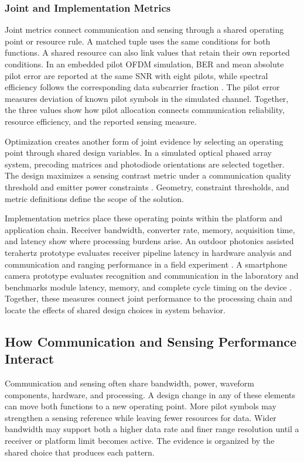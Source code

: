 \subsubsection{Joint and Implementation Metrics}

Joint metrics connect communication and sensing through a shared operating
point or resource rule. A matched tuple uses the same conditions for both
functions. A shared resource can also link values that retain their own
reported conditions. In an embedded pilot OFDM simulation, BER and mean
absolute pilot error are reported at the same SNR with eight pilots, while
spectral efficiency follows the corresponding data subcarrier fraction
\cite{OISAC_SCR00007}. The pilot error measures deviation of known pilot symbols
in the simulated channel. Together, the three values show how pilot allocation
connects communication reliability, resource efficiency, and the reported
sensing measure.

Optimization creates another form of joint evidence by selecting an operating
point through shared design variables. In a simulated optical phased array
system, precoding matrices and photodiode orientations are selected together.
The design maximizes a sensing contrast metric under a communication quality
threshold and emitter power constraints \cite{OISAC_SCR00940}. Geometry,
constraint thresholds, and metric definitions define the scope of the
solution.

Implementation metrics place these operating points within the platform and
application chain. Receiver bandwidth, converter rate, memory, acquisition
time, and latency show where processing burdens arise. An outdoor photonics
assisted terahertz prototype evaluates receiver pipeline latency in hardware
analysis and communication and ranging performance in a field experiment
\cite{OISAC_SCR01054}. A smartphone camera prototype evaluates recognition and
communication in the laboratory and benchmarks module latency, memory, and
complete cycle timing on the device \cite{OISAC_SCR00833}. Together, these
measures connect joint performance to the processing chain and locate the
effects of shared design choices in system behavior.

\subsection{How Communication and Sensing Performance Interact}

Communication and sensing often share bandwidth, power, waveform components,
hardware, and processing. A design change in any of these elements can move
both functions to a new operating point. More pilot symbols may strengthen a
sensing reference while leaving fewer resources for data. Wider bandwidth may
support both a higher data rate and finer range resolution until a receiver or
platform limit becomes active. The evidence is organized by the shared choice
that produces each pattern.

